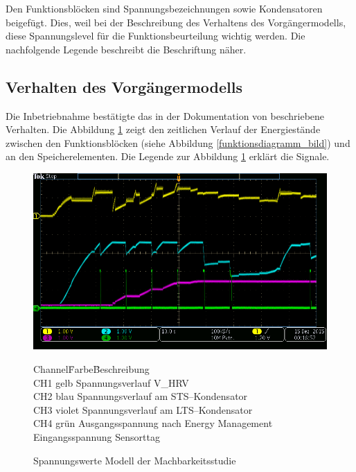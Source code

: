 Den Funktionsblöcken sind Spannungsbezeichnungen sowie Kondensatoren beigefügt. Dies, weil bei der Beschreibung des Verhaltens des Vorgängermodells, diese Spannungslevel für die Funktionsbeurteilung wichtig werden. Die nachfolgende Legende beschreibt die Beschriftung näher.

  

\subsection{Verhalten des Vorgängermodells}\label{verhalten} 

Die Inbetriebnahme bestätigte das in der Dokumentation von \cite{PA_bicycle} beschriebene Verhalten. Die Abbildung \ref{spannungMachbarkeit} zeigt den zeitlichen Verlauf der Energiestände zwischen den Funktionsblöcken (siehe Abbildung \ref{funktionsdiagramm_bild}) und an den Speicherelementen. Die Legende zur Abbildung  \ref{spannungMachbarkeit} erklärt die Signale.

\begin{figure}[ht]
    \includegraphics[width=1.0\textwidth]{3Vorgehen/imag/messungPA.png}
    \caption{Spannungswerte Modell der Machbarkeitsstudie}\label{spannungMachbarkeit} 
\begin{tabbing}
    Channel\quad\= Farbe\quad\= Beschreibung\\[0.8ex]
    CH1\> gelb\> Spannungsverlauf V\_HRV\\
    CH2\> blau\> Spannungsverlauf am STS--Kondensator\\
    CH3\> violet\> Spannungsverlauf am LTS--Kondensator\\
    CH4\> grün\> Ausgangsspannung nach Energy Management\\
     \>  \>      Eingangsspannung Sensorttag
\end{tabbing}    
\end{figure}

